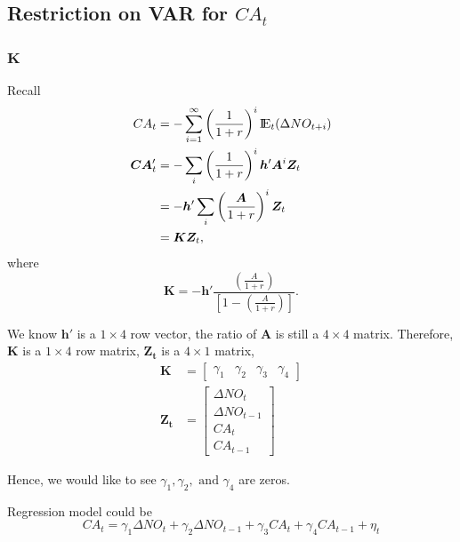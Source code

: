 \documentclass[12pt]{article}
\begin{document}
\subsection{Restriction on VAR for $ CA_{t} $}
\subsubsection{$ \bm{K} $}
Recall
\begin{align*}
CA_{t} &=  - \sum\limits_{i = 1} ^\infty \left( \frac{1}{1 + r} \right) ^{i}
{\rm I\!{E}}_{t}(\Delta NO_{t + i})\\
\bm{CA}_{t}' &=  - \sum\limits_{i} \left( \frac{1}{1 + r} \right)^{i} \bm{h}'\bm{A}^{i}
\bm{Z}_{t}\\
 &= - \bm{h}' \sum\limits_{i} \left( \frac{\bm{A}}{1 + r} \right)^{i} \bm{Z}_{t}\\
 &= \bm{K} \bm{Z}_{t},
\end{align*}
where
\begin{equation*}
\bm{K} =  - \bm{h}' \frac{\left( \frac{A}{1 + r} \right) }{
		\left[ 1 - \left( \frac{A}{1 + r} \right)  \right] 
}.
\end{equation*}

We know $ \bm{h}' $ is a $ 1  \times 4 $ row vector, the ratio of $ \bm{A} $ is still
a $ 4  \times 4 $ matrix. Therefore, $ \bm{K} $ is a $ 1  \times 4 $ row matrix, 
$ \bm{Z_{t}} $ is a $ 4  \times  1 $ matrix,
\begin{align*}
		\bm{K} &= \begin{bmatrix}
				\gamma_1 &\gamma_2 &\gamma_3 &\gamma_4
		\end{bmatrix}\\
		\bm{Z_{t}} &= \begin{bmatrix}
				\Delta NO_{t}\\
				\Delta NO_{t - 1}\\
				CA_{t}\\
				CA_{t - 1}
		\end{bmatrix}
\end{align*}

Hence, we would like to see $ \gamma_1, \gamma_2, \text{ and } \gamma_4 $ are zeros.

Regression model could be
\begin{equation*}
CA_{t} = \gamma_1 \Delta NO_{t} + \gamma_2 \Delta NO_{t - 1} + \gamma_3 CA_{t} + 
\gamma_4 CA_{t - 1} + \eta_{t}
\end{equation*}
\end{document}
